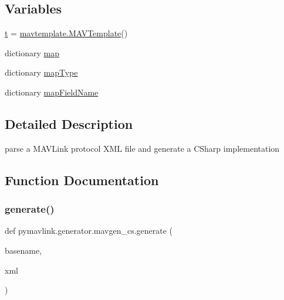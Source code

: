 \subsection*{Variables}
\begin{DoxyCompactItemize}
\item 
\mbox{\hyperlink{namespacepymavlink_1_1generator_1_1mavgen__cs_afd765216770d275a8155a15fcea9e228}{t}} = \mbox{\hyperlink{classpymavlink_1_1generator_1_1mavtemplate_1_1MAVTemplate}{mavtemplate.\+M\+A\+V\+Template}}()
\item 
dictionary \mbox{\hyperlink{namespacepymavlink_1_1generator_1_1mavgen__cs_ae949f75fb520f4e00cfb374dd701dfb2}{map}}
\item 
dictionary \mbox{\hyperlink{namespacepymavlink_1_1generator_1_1mavgen__cs_ac5f9ceb669ed4c71b42212ce69020f92}{map\+Type}}
\item 
dictionary \mbox{\hyperlink{namespacepymavlink_1_1generator_1_1mavgen__cs_a1ac6d29c09535167fbefeeec15f67a4e}{map\+Field\+Name}}
\end{DoxyCompactItemize}


\subsection{Detailed Description}
\begin{DoxyVerb}parse a MAVLink protocol XML file and generate a CSharp implementation\end{DoxyVerb}
 

\subsection{Function Documentation}
\mbox{\label{namespacepymavlink_1_1generator_1_1mavgen__cs_a401ce8f84466bcf2b9247fab7f057fd2}} 
\subsubsection{\texorpdfstring{generate()}{generate()}}
{\footnotesize\ttfamily def pymavlink.\+generator.\+mavgen\+\_\+cs.\+generate (\begin{DoxyParamCaption}\item[{}]{basename,  }\item[{}]{xml }\end{DoxyParamCaption})}


